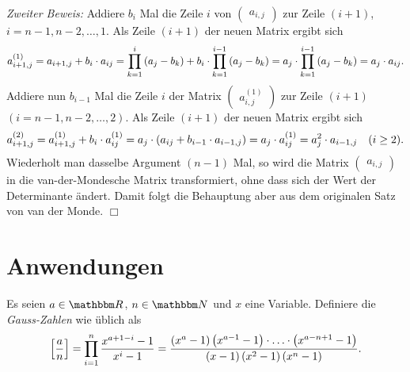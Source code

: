 \documentclass[11pt,a4paper]{article}
\begin{document}
\emph{Zweiter Beweis:} Addiere $b_i$ Mal die Zeile $i$ von $\begin{pmatrix}
  a_{i,j}\end{pmatrix}$ zur Zeile $(i+1)$, $i=n-1,n-2,\dots,1$. Als Zeile
$(i+1)$ der neuen Matrix ergibt sich 
\begin{gather*}
  a_{i+1,j}^{(1)}=a_{i+1,j}+b_i\cdot a_{ij}
  =\prod_{k=1}^i\left(a_j-b_k\right)+b_i\cdot\prod_{k=1}^{i-1}\left(a_j-b_k\right) 
  =a_j\cdot \prod_{k=1}^{i-1}\left(a_j-b_k\right) = a_j\cdot a_{ij}.
\end{gather*}
Addiere nun $b_{i-1}$ Mal die Zeile $i$ der Matrix $\begin{pmatrix}
  a_{i,j}^{(1)}\end{pmatrix}$ zur Zeile $(i+1)$ $(i=n-1,n-2,\dots,2)$.  Als
Zeile $(i+1)$ der neuen Matrix ergibt sich
\begin{gather*}
  a_{i+1,j}^{(2)}=a_{i+1,j}^{(1)}+b_i\cdot a_{ij}^{(1)}
  =a_j\cdot\left(a_{ij}+b_{i-1}\cdot a_{i-1,j}\right) = a_j\cdot a_{ij}^{(1)} =a_j^2\cdot
  a_{i-1,j}\quad (i\ge 2).
\end{gather*}
Wiederholt man dasselbe Argument $(n-1)$ Mal, so wird die Matrix
$\begin{pmatrix} a_{i,j}\end{pmatrix}$ in die van-der-Mondesche Matrix
transformiert, ohne dass sich der Wert der Determinante ändert.  Damit folgt
die Behauptung aber aus dem originalen Satz von van der Monde. \quad $\Box$

\section{Anwendungen}

\newcommand{\gauss}[2]{\ensuremath\sbr{\frac{#1}{#2}}}

Es seien $a\in\R$, $n\in\N$ und $x$ eine Variable. Definiere die
\emph{Gauss-Zahlen} wie üblich als
\begin{gather*}
  \gauss{a}{n}=\prod_{i=1}^n\frac{x^{a+1-i}-1}{x^i-1}
  =\frac{\br{x^a-1}\br{x^{a-1}-1}\m\dots\m\br{x^{a-n+1}-1}}
  {\br{x-1}\br{x^2-1}\br{x^n-1}}. 
\end{gather*}
\end{document}
